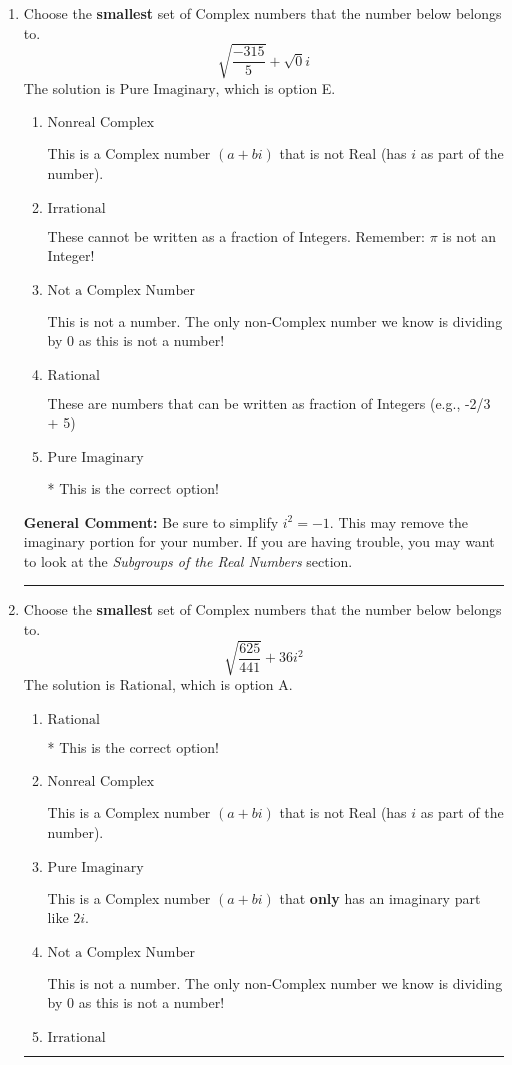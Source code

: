 \documentclass{extbook}[14pt]
\newcommand{\litem}[1]{\item #1

\rule{\textwidth}{0.4pt}}
\begin{document}
\begin{enumerate}\litem{
Choose the \textbf{smallest} set of Complex numbers that the number below belongs to.
\[ \sqrt{\frac{-315}{5}}+\sqrt{0}i \]The solution is \( \text{Pure Imaginary} \), which is option E.\begin{enumerate}[label=\Alph*.]
\item \( \text{Nonreal Complex} \)

This is a Complex number $(a+bi)$ that is not Real (has $i$ as part of the number).
\item \( \text{Irrational} \)

These cannot be written as a fraction of Integers. Remember: $\pi$ is not an Integer!
\item \( \text{Not a Complex Number} \)

This is not a number. The only non-Complex number we know is dividing by 0 as this is not a number!
\item \( \text{Rational} \)

These are numbers that can be written as fraction of Integers (e.g., -2/3 + 5)
\item \( \text{Pure Imaginary} \)

* This is the correct option!
\end{enumerate}

\textbf{General Comment:} Be sure to simplify $i^2 = -1$. This may remove the imaginary portion for your number. If you are having trouble, you may want to look at the \textit{Subgroups of the Real Numbers} section.
}
\litem{
Choose the \textbf{smallest} set of Complex numbers that the number below belongs to.
\[ \sqrt{\frac{625}{441}} + 36i^2 \]The solution is \( \text{Rational} \), which is option A.\begin{enumerate}[label=\Alph*.]
\item \( \text{Rational} \)

* This is the correct option!
\item \( \text{Nonreal Complex} \)

This is a Complex number $(a+bi)$ that is not Real (has $i$ as part of the number).
\item \( \text{Pure Imaginary} \)

This is a Complex number $(a+bi)$ that \textbf{only} has an imaginary part like $2i$.
\item \( \text{Not a Complex Number} \)

This is not a number. The only non-Complex number we know is dividing by 0 as this is not a number!
\item \( \text{Irrational} \)


\end{enumerate}}
\end{enumerate}
\end{document}
